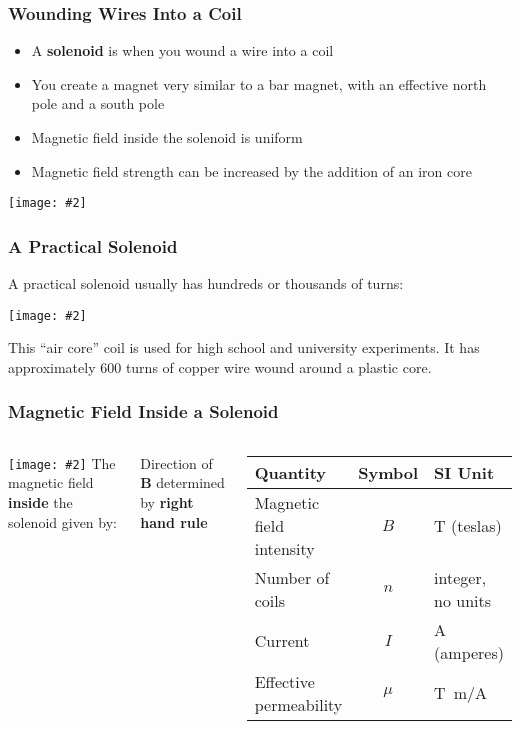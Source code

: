 \documentclass[12pt,aspectratio=169]{beamer}
\newcommand{\pic}[2]{\texttt{[image: \#2]}}
\newcommand{\mb}[1]{\mathbf{#1}}
\newcommand{\eq}[2]{\vspace{#1}{\Large\begin{displaymath}#2\end{displaymath}}}
\begin{document}
\begin{frame}
  \frametitle{Wounding Wires Into a Coil}
  \begin{itemize}
  \item A \textbf{solenoid} is when you wound a wire into a coil
  \item You create a magnet very similar to a bar magnet, with an effective
    north pole and a south pole
  \item Magnetic field inside the solenoid is uniform
  \item Magnetic field strength can be increased by the addition of an iron core
  \end{itemize}
  \begin{center}
    \pic{.5}{barsol.png}
  \end{center}
\end{frame}

\begin{frame}
  \frametitle{A Practical Solenoid}
  A practical solenoid usually has hundreds or thousands of turns:

  \vspace{-.2in}
  \begin{center}
    \pic{.45}{1020201515330450255.jpg}
  \end{center}

  \vspace{-.2in}
  This ``air core'' coil is used for high school and university experiments. It
  has approximately 600 turns of copper wire wound around a plastic core.
\end{frame}

\begin{frame}
  \frametitle{Magnetic Field Inside a Solenoid}
  \begin{columns}
    \pic{1.1}{magneticfield4.png}
    The magnetic field \textbf{inside} the solenoid given by:
    
    \eq{-.3in}{
      \boxed{B=\mu nI}
    }
    Direction of $\mb{B}$ determined by \textbf{right hand rule}
      \vspace{-.1in}
      \begin{center}
        \begin{tabular}{l|c|l}
          \rowcolor{pink}
          \textbf{Quantity} & \textbf{Symbol} & \textbf{SI Unit} \\ \hline
          Magnetic field intensity & $B$ & \si{T} (teslas)\\
          Number of coils          & $n$ & integer, no units\\
          Current                  & $I$ & \si{A} (amperes)\\
          Effective permeability & $\mu$ & \si{T.m/A}\\
        \end{tabular}
      \end{center}
  \end{columns}
\end{frame}
\end{document}
